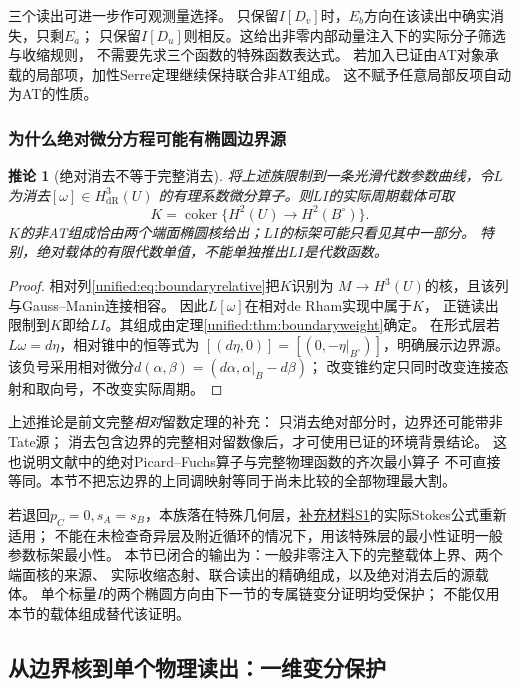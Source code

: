 \documentclass[11pt,a4paper,oneside]{ctexart}
\theoremstyle{cnplain}
\newtheorem{corollary}[theorem]{推论}
\theoremstyle{definition}
\theoremstyle{remark}
\newcommand{\dR}{\mathrm{dR}}
\numberwithin{equation}{section}
\newcommand{\otherref}[2]{\href{#1.pdf}{#2}}
\begin{document}
三个读出可进一步作可观测量选择。
只保留$I[D_v]$时，$E_b$方向在该读出中确实消失，只剩$E_a$；
只保留$I[D_u]$则相反。这给出非零内部动量注入下的实际分子筛选与收缩规则，
不需要先求三个函数的特殊函数表达式。
若加入已证由AT对象承载的局部项，加性Serre定理继续保持联合非AT组成。
这不赋予任意局部反项自动为AT的性质。

\subsubsection{为什么绝对微分方程可能有椭圆边界源}
\begin{corollary}[绝对消去不等于完整消去]\label{unified:cor:boundarysource}
将上述族限制到一条光滑代数参数曲线，令$L$为消去$[\omega]\in H^3_{\dR}(U)$
的有理系数微分算子。则$LI$的实际周期载体可取
\[
 K=\operatorname{coker}\{H^2(U)\longrightarrow H^2(B^\circ)\}.
\]
$K$的非AT组成恰由两个端面椭圆核给出；$LI$的标架可能只看见其中一部分。
特别，绝对载体的有限代数单值，不能单独推出$LI$是代数函数。
\end{corollary}
\begin{proof}
相对列\eqref{unified:eq:boundaryrelative}把$K$识别为
$M\to H^3(U)$的核，且该列与Gauss--Manin连接相容。
因此$L[\omega]$在相对de Rham实现中属于$K$，
正链读出限制到$K$即给$LI$。其组成由定理\ref{unified:thm:boundaryweight}确定。
在形式层若$L\omega=d\eta$，相对锥中的恒等式为
$[(d\eta,0)]=[(0,-\eta|_{B^\circ})]$，明确展示边界源。
该负号采用相对微分$d(\alpha,\beta)=(d\alpha,\alpha|_B-d\beta)$；
改变锥约定只同时改变连接态射和取向号，不改变实际周期。
\end{proof}

上述推论是前文完整\emph{相对}留数定理的补充：
只消去绝对部分时，边界还可能带非Tate源；
消去包含边界的完整相对留数像后，才可使用已证的环境背景结论。
这也说明文献中的绝对Picard--Fuchs算子与完整物理函数的齐次最小算子
不可直接等同。本节不把忘边界的上同调映射等同于尚未比较的全部物理最大割。

若退回$p_C=0,s_A=s_B$，本族落在特殊几何层，\otherref{feynman_periods_supplement}{补充材料S1}的实际Stokes公式重新适用；
不能在未检查奇异层及附近循环的情况下，用该特殊层的最小性证明一般参数标架最小性。
本节已闭合的输出为：一般非零注入下的完整载体上界、两个端面核的来源、
实际收缩态射、联合读出的精确组成，以及绝对消去后的源载体。
单个标量$I$的两个椭圆方向由下一节的专属链变分证明均受保护；
不能仅用本节的载体组成替代该证明。



\subsection{从边界核到单个物理读出：一维变分保护}
\label{unified:sec:scalarboundary}
\end{document}
